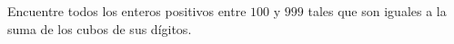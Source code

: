 Encuentre todos los enteros positivos entre $100$ y $999$ tales que son iguales a la suma de los cubos de sus dígitos.